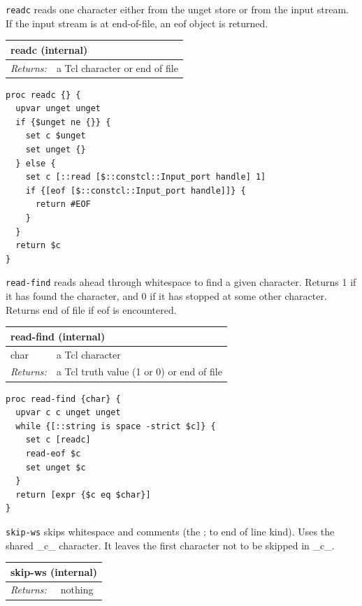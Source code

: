 \documentclass[twoside,9pt]{report}
\begin{document}
\texttt{readc} reads one character either from the unget store or from the input stream. If the input stream is at end-of-file, an eof object is returned.

\begin{tabular}{ |l l| }
\hline
\multicolumn{2}{|l|}{readc (internal)} \\
\hline
\textit{Returns:} & a Tcl character or end of file \\
\hline
\end{tabular}

\noindent\makebox[\linewidth]{\rule{\linewidth}{0.4pt}}
\begin{lstlisting}
proc readc {} {
  upvar unget unget
  if {$unget ne {}} {
    set c $unget
    set unget {}
  } else {
    set c [::read [$::constcl::Input_port handle] 1]
    if {[eof [$::constcl::Input_port handle]]} {
      return #EOF
    }
  }
  return $c
}
\end{lstlisting}
\noindent\makebox[\linewidth]{\rule{\linewidth}{0.4pt}}

\texttt{read-find} reads ahead through whitespace to find a given character. Returns 1 if it has found the character, and 0 if it has stopped at some other character. Returns end of file if eof is encountered.

\begin{tabular}{ |l l| }
\hline
\multicolumn{2}{|l|}{read-find (internal)} \\
\hline
char & a Tcl character \\
\textit{Returns:} & a Tcl truth value (1 or 0) or end of file \\
\hline
\end{tabular}

\noindent\makebox[\linewidth]{\rule{\linewidth}{0.4pt}}
\begin{lstlisting}
proc read-find {char} {
  upvar c c unget unget
  while {[::string is space -strict $c]} {
    set c [readc]
    read-eof $c
    set unget $c
  }
  return [expr {$c eq $char}]
}
\end{lstlisting}
\noindent\makebox[\linewidth]{\rule{\linewidth}{0.4pt}}

\texttt{skip-ws} skips whitespace and comments (the ; to end of line kind). Uses the shared \_c\_ character. It leaves the first character not to be skipped in \_c\_.

\begin{tabular}{ |l l| }
\hline
\multicolumn{2}{|l|}{skip-ws (internal)} \\
\hline
\textit{Returns:} & nothing \\
\hline
\end{tabular}
\end{document}

